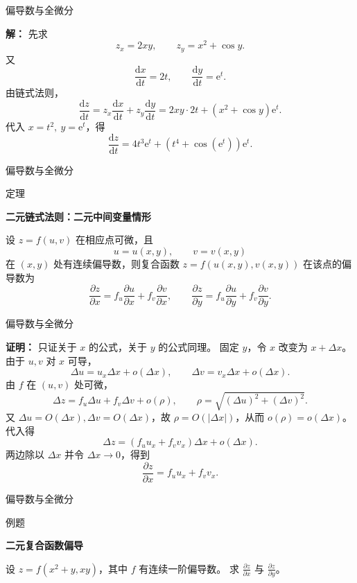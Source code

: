 \documentclass[aspectratio=169,10pt,fontset=fandol]{ctexbeamer}
\newcommand{\dd}{\mathrm{d}}
\newcommand{\ee}{\mathrm{e}}
\begin{document}
\begin{frame}[t,fragile]{偏导数与全微分}
\footnotesize
{\footnotesize
\textbf{解：}
先求
\[
z_x=2xy,\qquad z_y=x^2+\cos y.
\]
又
\[
\frac{\dd x}{\dd t}=2t,\qquad \frac{\dd y}{\dd t}=\ee^t.
\]
由链式法则，
\[
\frac{\dd z}{\dd t}
=z_x\frac{\dd x}{\dd t}+z_y\frac{\dd y}{\dd t}
=2xy\cdot2t+(x^2+\cos y)\ee^t.
\]
代入 $x=t^2,\ y=\ee^t$，得
\[
\frac{\dd z}{\dd t}
=4t^3\ee^t+(t^4+\cos(\ee^t))\ee^t.
\]

}
\end{frame}
\begin{frame}[t,fragile]{偏导数与全微分}
\footnotesize
\begin{block}{定理}
{\footnotesize
\textbf{二元链式法则：二元中间变量情形}\par

设 $z=f(u,v)$ 在相应点可微，且
\[
u=u(x,y),\qquad v=v(x,y)
\]
在 $(x,y)$ 处有连续偏导数，则复合函数 $z=f(u(x,y),v(x,y))$ 在该点的偏导数为
\[
\frac{\partial z}{\partial x}=f_u\frac{\partial u}{\partial x}+f_v\frac{\partial v}{\partial x},
\qquad
\frac{\partial z}{\partial y}=f_u\frac{\partial u}{\partial y}+f_v\frac{\partial v}{\partial y}.
\]

}
\end{block}
\end{frame}
\begin{frame}[t,fragile]{偏导数与全微分}
\footnotesize
{\footnotesize
\textbf{证明：}
只证关于 $x$ 的公式，关于 $y$ 的公式同理。 固定 $y$，令 $x$ 改变为 $x+\Delta x$。 由于 $u,v$ 对 $x$ 可导，
\[
\Delta u=u_x\Delta x+o(\Delta x),\qquad
\Delta v=v_x\Delta x+o(\Delta x).
\]
由 $f$ 在 $(u,v)$ 处可微，
\[
\Delta z=f_u\Delta u+f_v\Delta v+o(\rho),
\qquad \rho=\sqrt{(\Delta u)^2+(\Delta v)^2}.
\]
又 $\Delta u=O(\Delta x),\Delta v=O(\Delta x)$，故 $\rho=O(|\Delta x|)$，从而 $o(\rho)=o(\Delta x)$。 代入得
\[
\Delta z=(f_u u_x+f_v v_x)\Delta x+o(\Delta x).
\]
两边除以 $\Delta x$ 并令 $\Delta x\to0$，得到
\[
\frac{\partial z}{\partial x}=f_u u_x+f_v v_x.
\]

}
\end{frame}
\begin{frame}[t,fragile]{偏导数与全微分}
\footnotesize
\begin{block}{例题}
{\footnotesize
\textbf{二元复合函数偏导}\par

设 $z=f(x^2+y,xy)$，其中 $f$ 有连续一阶偏导数。 求 $\frac{\partial z}{\partial x}$ 与 $\frac{\partial z}{\partial y}$。

}
\end{block}
\end{frame}
\end{document}
